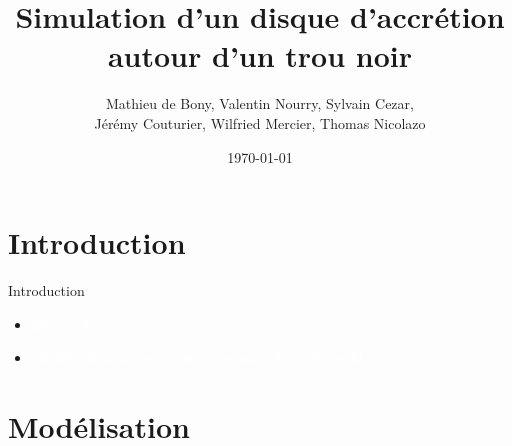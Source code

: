 \documentclass{beamer}
\title{Simulation d'un disque d'accrétion autour d'un trou noir}
\author{Mathieu de Bony, Valentin Nourry, Sylvain Cezar,\\Jérémy Couturier, Wilfried Mercier, Thomas Nicolazo}
\date{\today}
\begin{document}

{
\begin{frame}
  \titlepage
\end{frame}

}


\section{Introduction}

{
\begin{frame}{Introduction}
  \begin{itemize}
    \item \textcolor{white}{Binaire X}
    \item \textcolor{white}{Modélisation adaptée à des trous noirs de quelques $M_{\odot}$}
  \end{itemize}
\end{frame}
}

\section{Modélisation}
\end{document}

